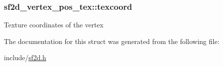 \subsubsection[{texcoord}]{ sf2d\+\_\+vertex\+\_\+pos\+\_\+tex\+::texcoord}\label{structsf2d__vertex__pos__tex_a72fcf7753d1977b813b6e5336c27fce6}
Texture coordinates of the vertex 

The documentation for this struct was generated from the following file\+:\begin{DoxyCompactItemize}
\item 
include/\hyperlink{sf2d_8h}{sf2d.\+h}\end{DoxyCompactItemize}
